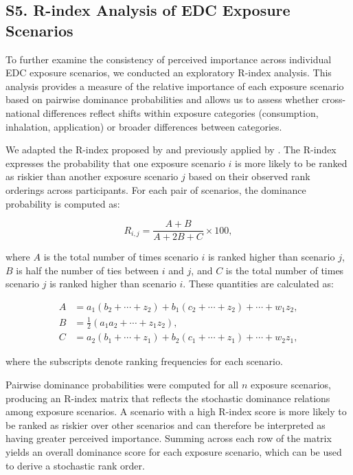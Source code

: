 \subsection{S5. R-index Analysis of EDC Exposure Scenarios}

To further examine the consistency of perceived importance across individual EDC exposure scenarios, we conducted an exploratory R-index analysis. This analysis provides a measure of the relative importance of each exposure scenario based on pairwise dominance probabilities and allows us to assess whether cross-national differences reflect shifts within exposure categories (consumption, inhalation, application) or broader differences between categories.

We adapted the R-index proposed by \citet{o1992understanding} and previously applied by \citet{lagerkvist2013consumer}. The R-index expresses the probability that one exposure scenario $i$ is more likely to be ranked as riskier than another exposure scenario $j$ based on their observed rank orderings across participants. For each pair of scenarios, the dominance probability is computed as:

\begin{equation}
R_{i,j} = \frac{A + B}{A + 2B + C} \times 100,
\end{equation}

where $A$ is the total number of times scenario $i$ is ranked higher than scenario $j$, $B$ is half the number of ties between $i$ and $j$, and $C$ is the total number of times scenario $j$ is ranked higher than scenario $i$. These quantities are calculated as:

\begin{align}
A &= a_{1}(b_{2} + \cdots + z_{2}) + b_{1}(c_{2} + \cdots + z_{2}) + \cdots + w_{1} z_{2}, \\
B &= \tfrac{1}{2}(a_{1}a_{2} + \cdots + z_{1}z_{2}), \\
C &= a_{2}(b_{1} + \cdots + z_{1}) + b_{2}(c_{1} + \cdots + z_{1}) + \cdots + w_{2} z_{1},
\end{align}

where the subscripts denote ranking frequencies for each scenario.

Pairwise dominance probabilities were computed for all $n$ exposure scenarios, producing an R-index matrix that reflects the stochastic dominance relations among exposure scenarios. A scenario with a high R-index score is more likely to be ranked as riskier over other scenarios and can therefore be interpreted as having greater perceived importance. Summing across each row of the matrix yields an overall dominance score for each exposure scenario, which can be used to derive a stochastic rank order.

